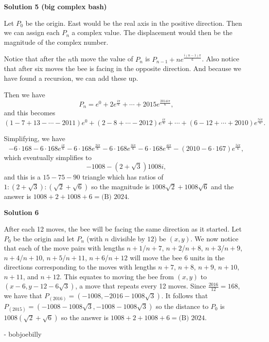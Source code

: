 \begin{enumerate}
 



\textbf{Solution 5 (big complex bash)}

Let $P_0$ be the origin. East would be the real axis in the positive direction. Then we can assign each $P_n$ a complex value. The displacement would then be the magnitude of the complex number.

 Notice that after the $n$th move the value of $P_n$ is $P_{n-1}+ne^{\frac{i(n-1)\pi}{6}}$. Also notice that after six moves the bee is facing in the opposite direction. And because we have found a recursion, we can add these up. 

 Then we have 
 \[P_n=e^{0}+2e^{\frac{i\pi}{6}}+\cdots+2015e^{\frac{2014i\pi}{6}},\] and this becomes 
 \[(1-7+13-\cdots-2011)e^0+(2-8+\cdots-2012)e^{\frac{i\pi}{6}}+\cdots+(6-12+\cdots+2010)e^{\frac{5i\pi}{6}}.\]

 Simplifying, we have 
 \[-6\cdot168-6\cdot168e^{\frac{i\pi}{6}}-6\cdot168e^{\frac{2i\pi}{6}}-6\cdot168e^{\frac{3i\pi}{6}}-6\cdot168e^{\frac{4i\pi}{6}}-(2010-6\cdot167)e^{\frac{5i\pi}{6}},\] which eventually simplifies to 
 \[-1008-(2+\sqrt3)1008i,\] and this is a $15-75-90$ triangle which has ratios of $1:(2+\sqrt3):(\sqrt2+\sqrt6)$ so the magnitude is $1008\sqrt2+1008\sqrt6$ and the answer is $1008+2+1008+6=\boxed{\text{(B) }2024}$.

 


 



\textbf{Solution 6}

After each 12 moves, the bee will be facing the same direction as it started. Let $P_0$ be the origin and let $P_n$ (with $n$ divisible by $12$) be $(x,y)$. We now notice that each of the move pairs with lengths $n+1$/$n+7$, $n+2$/$n+8$, $n+3$/$n+9$, $n+4$/$n+10$, $n+5$/$n+11$, $n+6$/$n+12$ will move the bee 6 units in the directions corresponding to the moves with lengths $n+7$, $n+8$, $n+9$, $n+10$, $n+11$, and $n+12$. This equates to moving the bee from $(x,y)$ to $(x-6,y-12-6\sqrt{3})$, a move that repeats every 12 moves. Since $\frac{2016}{12} = 168$, we have that $P_(2016) = (-1008, -2016-1008\sqrt{3})$. It follows that $P_(2015) = (-1008-1008\sqrt{3}, -1008-1008\sqrt{3})$ so the distance to $P_0$ is $1008(\sqrt{2} + \sqrt{6})$ so the answer is $1008 + 2 + 1008 + 6 = \boxed{\text{(B) } 2024}$.

 - bobjoebilly

 


\end{enumerate}